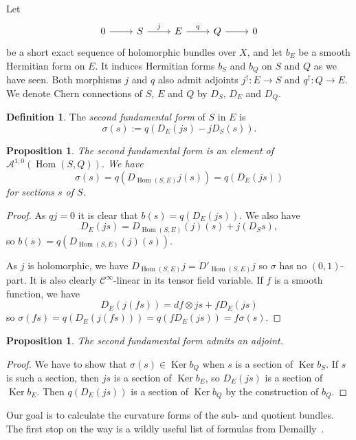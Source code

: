 \documentclass[10pt,a4paper]{amsart}
\newtheorem{prop}[theo]{Proposition}
\theoremstyle{definition}
\newtheorem{defi}[theo]{Definition}
\newcommand{\cc}[1]{\mathcal{#1}}
\DeclareMathOperator{\Ker}{Ker}
\DeclareMathOperator{\Hom}{Hom}
\def\snd{\sigma}
\begin{document}
Let
\[
\begin{tikzcd}
0 \ar[r] &
S \ar[r,"j"] &
E \ar[r,"q"] &
Q \ar[r] &
0
\end{tikzcd}
\]
be a short exact sequence of holomorphic bundles over $X$, and let $b_E$ be a smooth Hermitian form on $E$. It induces Hermitian forms $b_S$ and $b_Q$ on $S$ and $Q$ as we have seen. Both morphisms $j$ and $q$ also admit adjoints $j^\dagger: E \to S$ and $q^\dagger : Q \to E$. We denote Chern connections of $S$, $E$ and $Q$ by $D_S$, $D_E$ and $D_Q$.




\begin{defi}
The \emph{second fundamental form} of $S$ in $E$ is
\[
\snd(s) := q(D_E(js) - jD_S(s)).
\]
\end{defi}

\begin{prop}
The second fundamental form is an element of $\cc A^{1,0}(\Hom(S,Q))$.
We have
\[
\snd(s)
= q(D_{\Hom(S,E)}j(s))
= q(D_E(js))
\]
for sections $s$ of $S$.
\end{prop}

\begin{proof}
As $qj = 0$ it is clear that $b(s) = q(D_E(js))$. We also have
\[
D_E(js) = D_{\Hom(S,E)}(j)(s) + j(D_Ss),
\]
so $b(s) = q(D_{\Hom(S,E)}(j)(s))$.

As $j$ is holomorphic, we have $D_{\Hom(S,E)}j = D'_{\Hom(S,E)}j$ so $\snd$ has no $(0,1)$-part. It is also clearly $\cc C^\infty$-linear in its tensor field variable. If $f$ is a smooth function, we have
\[
D_E(j(fs))
= df \otimes js + f D_E(js)
\]
so $\snd(fs) = q(D_E(j(fs))) = q(f D_E(js)) = f\snd(s)$.
\end{proof}


\begin{prop}
The second fundamental form admits an adjoint.
\end{prop}

\begin{proof}
We have to show that $\snd(s) \in \Ker b_Q$ when $s$ is a section of $\Ker b_S$. If $s$ is such a section, then $js$ is a section of $\Ker b_E$, so $D_E(js)$ is a section of $\Ker b_E$. Then $q(D_E(js))$ is a section of $\Ker b_Q$ by the construction of $b_Q$.
\end{proof}



Our goal is to calculate the curvature forms of the sub- and quotient bundles. The first stop on the way is a wildly useful list of formulas from Demailly~{{\cite[Theorem~14.3]{demailly-complex}}}.
\end{document}

